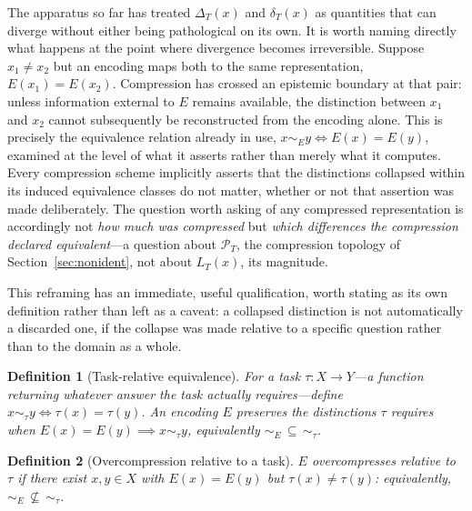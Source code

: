 \documentclass[11pt]{article}
\theoremstyle{plain}
\newtheorem{definition}{Definition}
\begin{document}
The apparatus so far has treated $\Delta_T(x)$ and $\delta_T(x)$ as quantities that can diverge without either being pathological on its own. It is worth naming directly what happens at the point where divergence becomes irreversible. Suppose $x_1 \ne x_2$ but an encoding maps both to the same representation, $E(x_1) = E(x_2)$. Compression has crossed an epistemic boundary at that pair: unless information external to $E$ remains available, the distinction between $x_1$ and $x_2$ cannot subsequently be reconstructed from the encoding alone. This is precisely the equivalence relation already in use, $x \sim_E y \iff E(x) = E(y)$, examined at the level of what it asserts rather than merely what it computes. Every compression scheme implicitly asserts that the distinctions collapsed within its induced equivalence classes do not matter, whether or not that assertion was made deliberately. The question worth asking of any compressed representation is accordingly not \emph{how much was compressed} but \emph{which differences the compression declared equivalent}---a question about $\mathcal{P}_T$, the compression topology of Section~\ref{sec:nonident}, not about $L_T(x)$, its magnitude.

This reframing has an immediate, useful qualification, worth stating as its own definition rather than left as a caveat: a collapsed distinction is not automatically a discarded one, if the collapse was made relative to a specific question rather than to the domain as a whole.

\begin{definition}[Task-relative equivalence]
For a task $\tau : X \to Y$---a function returning whatever answer the task actually requires---define $x \sim_\tau y \iff \tau(x) = \tau(y)$. An encoding $E$ \emph{preserves the distinctions $\tau$ requires} when $E(x) = E(y) \implies x \sim_\tau y$, equivalently $\sim_E \, \subseteq \, \sim_\tau$.
\end{definition}

\begin{definition}[Overcompression relative to a task]
$E$ \emph{overcompresses relative to $\tau$} if there exist $x, y \in X$ with $E(x) = E(y)$ but $\tau(x) \ne \tau(y)$: equivalently, $\sim_E \, \not\subseteq \, \sim_\tau$.
\end{definition}
\end{document}
